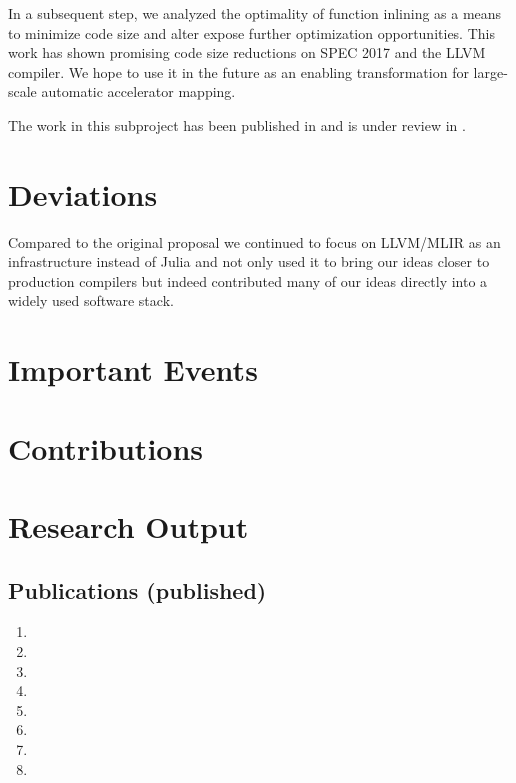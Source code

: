\documentclass[11pt, manuscript,\review anonymous]{acmart}
\begin{document}
In a subsequent step, we analyzed the optimality of function inlining as a means
to minimize code size and alter expose further optimization opportunities. This
work has shown promising code size reductions on SPEC 2017 and the LLVM compiler.
We hope to use it in the future as an enabling transformation for large-scale
automatic accelerator mapping.

The work in this subproject has been published in \citet{copic2021} and is under review in
\citet{theo2021}.

\section{Deviations}

Compared to the original proposal we continued to focus on LLVM/MLIR as an
infrastructure instead of Julia and not only used it to bring our ideas closer
to production compilers but indeed contributed many of our ideas directly into
a widely used software stack.

\section{Important Events}

\section{Contributions}

\section{Research Output}

\subsection{Publications (published)}
\begin{enumerate}
	\item {}
	\item {}
	\item {}
	\item {}
	\item {}
	\item {}
	\item {}
	\item {}
\end{enumerate}
\end{document}
